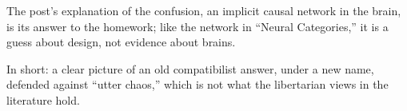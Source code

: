 \begin{afterword}
The post's explanation of the confusion, an implicit causal network in the brain, is its answer to the homework; like the network in ``Neural Categories,'' it is a guess about design, not evidence about brains.

In short: a clear picture of an old compatibilist answer, under a new name, defended against ``utter chaos,'' which is not what the libertarian views in the literature hold.
\end{afterword}
